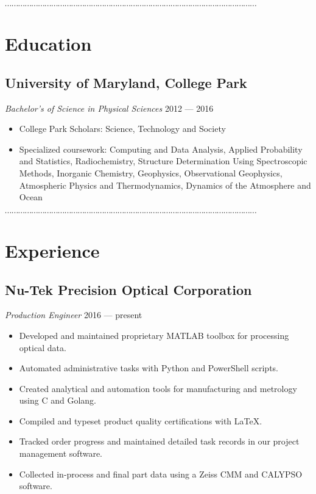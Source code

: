 \documentclass[10pt]{article}
\newcommand{\dotfringe}{
    \begin{center}
      $\cdots\cdots\cdots\cdots\cdots\cdots\cdots\cdots\cdots\cdots\cdots\cdots\cdots\cdots\cdots\cdots\cdots\cdots\cdots\cdots\cdots\cdots\cdots\cdots\cdots\cdots\cdots\cdots\cdots\cdots\cdots\cdots\cdots\cdots\cdots\cdots\cdots\cdots$
    \end{center}
}
\begin{document}

\dotfringe{}

\section*{Education}
\subsection*{University of Maryland, College Park}
\textit{Bachelor's of Science in Physical Sciences} \hfill 2012 --- 2016
\begin{itemize}
  \item College Park Scholars: Science, Technology and Society
  \item Specialized coursework: Computing and Data Analysis, Applied Probability and Statistics, Radiochemistry, Structure Determination Using Spectroscopic Methods, Inorganic Chemistry, Geophysics, Observational Geophysics, Atmospheric Physics and Thermodynamics, Dynamics of the Atmosphere and Ocean
\end{itemize}

\dotfringe{}

\section*{Experience}
\subsection*{Nu-Tek Precision Optical Corporation}
\textit{Production Engineer} \hfill 2016 --- present
\begin{itemize}
  \item Developed and maintained proprietary MATLAB toolbox for processing optical data.
  \item Automated administrative tasks with Python and PowerShell scripts.
  \item Created analytical and automation tools for manufacturing and metrology using C and Golang.
  \item Compiled and typeset product quality certifications with \LaTeX.
  \item Tracked order progress and maintained detailed task records in our project management software.
  \item Collected in-process and final part data using a Zeiss CMM and CALYPSO software.
\end{itemize}
\end{document}
